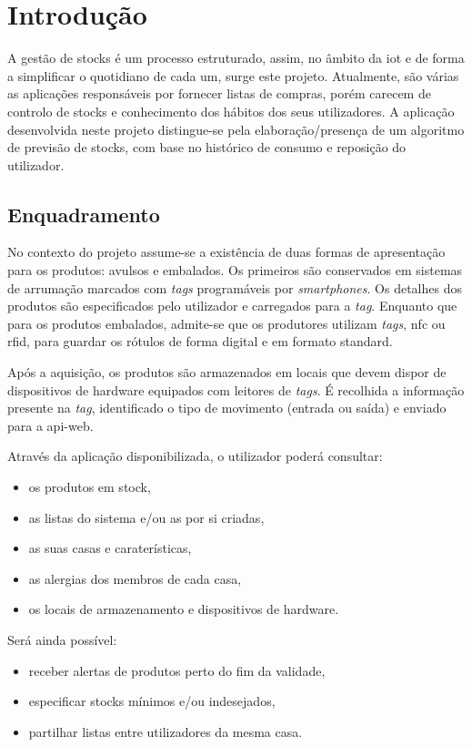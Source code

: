 %
%
\chapter{Introdução} \label{cap1}

A gestão de stocks é um processo estruturado, assim, no âmbito da \acrfull{iot} e de forma a simplificar o quotidiano de cada um, surge este projeto. Atualmente, são várias as aplicações responsáveis por fornecer listas de compras, porém carecem de controlo de stocks e conhecimento dos hábitos dos seus utilizadores. A aplicação desenvolvida neste projeto distingue-se pela elaboração/presença de um algoritmo de previsão de stocks, com base no histórico de consumo e reposição do utilizador.

%
%
\section{Enquadramento} \label{sec11}

No contexto do projeto assume-se a existência de duas formas de apresentação para os produtos: avulsos e embalados. Os primeiros são conservados em sistemas de arrumação marcados com \textit{tags} programáveis por \textit{smartphones}. Os detalhes dos produtos são especificados pelo utilizador e carregados para a \textit{tag}. Enquanto que para os produtos embalados, admite-se que os produtores utilizam \textit{tags}, \acrfull{nfc} ou \acrfull{rfid}, para guardar os rótulos de forma digital e em formato standard.

Após a aquisição, os produtos são armazenados em locais que devem dispor de dispositivos de hardware equipados com leitores de \textit{tags}. É recolhida a informação presente na \textit{tag}, identificado o tipo de movimento (entrada ou saída) e enviado para a \gls{api-web}. 

Através da aplicação disponibilizada, o utilizador poderá consultar:
\begin{itemize} \itemsep 0pt
	\item os produtos em stock,
	\item as listas do sistema e/ou as por si criadas,
	\item as suas casas e caraterísticas,
	\item as alergias dos membros de cada casa,
	\item os locais de armazenamento e dispositivos de hardware.
\end{itemize}

Será ainda possível:
\begin{itemize} \itemsep 0pt
	\item receber alertas de produtos perto do fim da validade,
	\item especificar stocks mínimos e/ou indesejados,
	\item partilhar listas entre utilizadores da mesma casa.
\end{itemize}

